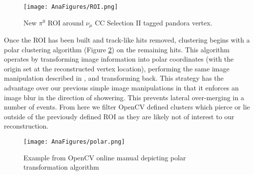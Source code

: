 \documentclass[12pt]{article}
\begin{document}
\begin{figure}[h!]
\centering
\texttt{[image: AnaFigures/ROI.png]}
\caption{New $\pi^0$ ROI around $\nu_\mu$ CC Selection II tagged pandora vertex. }
\label{fig:roi}
\end{figure}

\par Once the ROI has been built and track-like hits removed, clustering begins with a polar clustering algorithm (Figure \ref{fig:polar}) on the remaining hits. This algorithm operates by transforming image information into polar coordinates (with the origin set at the reconstructed vertex location), performing the same image manipulation described in \cite{bib:5856}, and transforming back. This strategy has the advantage over our previous simple image manipulations in that it enforces an image blur in the direction of showering. This prevents lateral over-merging in a number of events. From here we filter OpenCV defined clusters which pierce or lie outside of the previously defined ROI as they are likely not of interest to our reconstruction. 

\begin{figure}[h!]
\centering
\texttt{[image: AnaFigures/polar.png]}
\caption{ Example from OpenCV online manual depicting polar transformation algorithm }
\label{fig:polar}
\end{figure}
\end{document}
